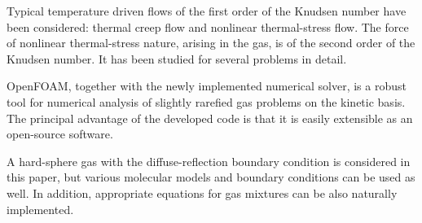 \documentclass[smallextended, referee]{svjour3} %
\begin{document}
Typical temperature driven flows of the first order of the Knudsen number have been considered:
thermal creep flow and nonlinear thermal-stress flow.
The force of nonlinear thermal-stress nature, arising in the gas, is of the second order of
the Knudsen number. It has been studied for several problems in detail.

OpenFOAM\textregistered{}, together with the newly implemented numerical solver,
is a robust tool for numerical analysis of slightly rarefied gas problems
on the kinetic basis. The principal advantage of the developed code is that
it is easily extensible as an open-source software.

A hard-sphere gas with the diffuse-reflection boundary condition is considered in this paper,
but various molecular models and boundary conditions can be used as well.
In addition, appropriate equations for gas mixtures can be also naturally implemented.


\end{document}
